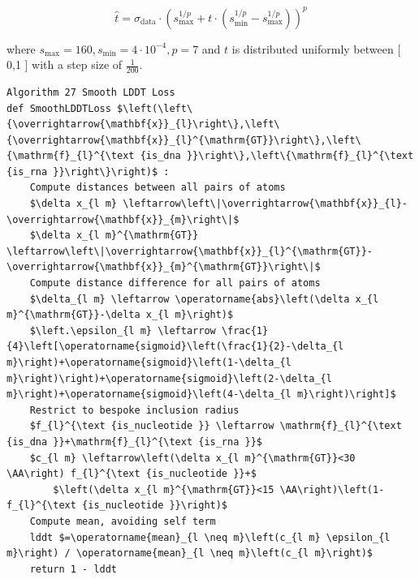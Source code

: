 \documentclass[10pt]{article}
\def\AA{\mathring{\mathrm{A}}}
\begin{document}
\begin{equation*}
\hat{t}=\sigma_{\mathrm{data}} \cdot\left(s_{\max }^{1 / p}+t \cdot\left(s_{\min }^{1 / p}-s_{\max }^{1 / p}\right)\right)^{p} \tag{7}
\end{equation*}


where $s_{\max }=160, s_{\min }=4 \cdot 10^{-4}, p=7$ and $t$ is distributed uniformly between [ 0,1 ] with a step size of $\frac{1}{200}$.

\begin{verbatim}
Algorithm 27 Smooth LDDT Loss
def SmoothLDDTLoss $\left(\left\{\overrightarrow{\mathbf{x}}_{l}\right\},\left\{\overrightarrow{\mathbf{x}}_{l}^{\mathrm{GT}}\right\},\left\{\mathrm{f}_{l}^{\text {is_dna }}\right\},\left\{\mathrm{f}_{l}^{\text {is_rna }}\right\}\right)$ :
    Compute distances between all pairs of atoms
    $\delta x_{l m} \leftarrow\left\|\overrightarrow{\mathbf{x}}_{l}-\overrightarrow{\mathbf{x}}_{m}\right\|$
    $\delta x_{l m}^{\mathrm{GT}} \leftarrow\left\|\overrightarrow{\mathbf{x}}_{l}^{\mathrm{GT}}-\overrightarrow{\mathbf{x}}_{m}^{\mathrm{GT}}\right\|$
    Compute distance difference for all pairs of atoms
    $\delta_{l m} \leftarrow \operatorname{abs}\left(\delta x_{l m}^{\mathrm{GT}}-\delta x_{l m}\right)$
    $\left.\epsilon_{l m} \leftarrow \frac{1}{4}\left[\operatorname{sigmoid}\left(\frac{1}{2}-\delta_{l m}\right)+\operatorname{sigmoid}\left(1-\delta_{l m}\right)\right)+\operatorname{sigmoid}\left(2-\delta_{l m}\right)+\operatorname{sigmoid}\left(4-\delta_{l m}\right)\right]$
    Restrict to bespoke inclusion radius
    $f_{l}^{\text {is_nucleotide }} \leftarrow \mathrm{f}_{l}^{\text {is_dna }}+\mathrm{f}_{l}^{\text {is_rna }}$
    $c_{l m} \leftarrow\left(\delta x_{l m}^{\mathrm{GT}}<30 \AA\right) f_{l}^{\text {is_nucleotide }}+$
        $\left(\delta x_{l m}^{\mathrm{GT}}<15 \AA\right)\left(1-f_{l}^{\text {is_nucleotide }}\right)$
    Compute mean, avoiding self term
    lddt $=\operatorname{mean}_{l \neq m}\left(c_{l m} \epsilon_{l m}\right) / \operatorname{mean}_{l \neq m}\left(c_{l m}\right)$
    return 1 - lddt
\end{verbatim}
\end{document}
